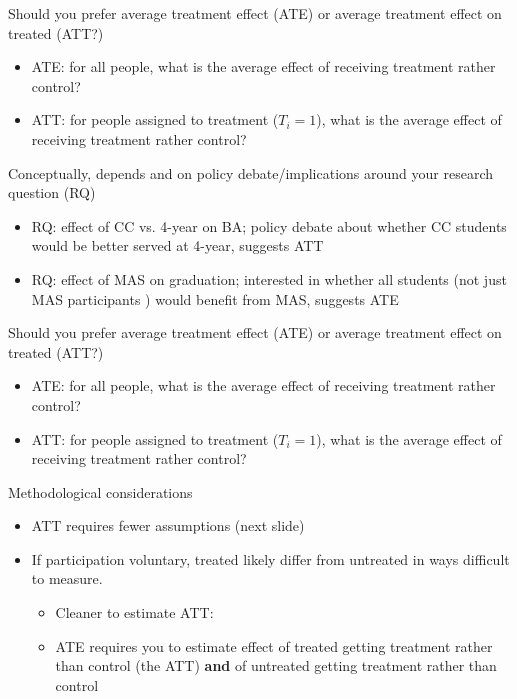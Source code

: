 \begin{frame}{Should you prefer average treatment effect (ATE) or average treatment effect on treated (ATT?)}{}

	\begin{itemize}
		\item ATE: for all people, what is the average effect of receiving treatment rather control? 
		\item ATT: for people assigned to treatment ($T_i=1$), what is the average effect of receiving treatment rather control? 
	\end{itemize}
	\vspace{3mm}
	Conceptually, depends and on policy debate/implications around your research question (RQ)
	\begin{itemize}
		\item RQ: effect of CC vs. 4-year on BA; policy debate about whether CC students would be better served at 4-year, suggests ATT
		\item RQ: effect of MAS on graduation; interested in whether all students (not just MAS participants ) would benefit from MAS, suggests ATE
	\end{itemize}

\end{frame}

\begin{frame}{Should you prefer average treatment effect (ATE) or average treatment effect on treated (ATT?)}{}

	\begin{itemize}
		\item ATE: for all people, what is the average effect of receiving treatment rather control? 
		\item ATT: for people assigned to treatment ($T_i=1$), what is the average effect of receiving treatment rather control? 
	\end{itemize}
	\vspace{3mm}

	Methodological considerations
	\begin{itemize}
		\item ATT requires fewer assumptions (next slide)
		\item If participation voluntary, treated likely differ from untreated in ways difficult to measure.
		\begin{itemize}
			\item Cleaner to estimate ATT: 
			\item ATE requires you to estimate effect of treated getting treatment rather than control (the ATT) \textbf{and} of untreated getting treatment rather than control
		\end{itemize}
	\end{itemize}		
\end{frame}

